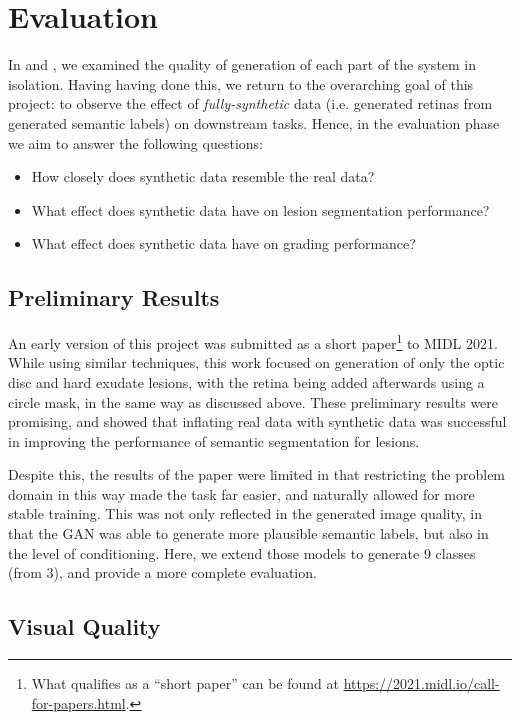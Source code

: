 \chapter{Evaluation} \label{cha:evaluation}

In  and , we examined the quality of generation of each part of the system in isolation.
Having having done this, we return to the overarching goal of this project: to observe the effect of \emph{fully-synthetic} data (i.e. generated retinas from generated semantic labels) on downstream tasks.
Hence, in the evaluation phase we aim to answer the following questions:
\begin{itemize}
    \item How closely does synthetic data resemble the real data?
    \item What effect does synthetic data have on lesion segmentation performance?
    \item What effect does synthetic data have on grading performance?
\end{itemize}

\section{Preliminary Results} \label{sec:prelim}

An early version of this project was submitted as a short paper\footnote{What qualifies as a ``short paper'' can be found at \url{https://2021.midl.io/call-for-papers.html}.} to MIDL 2021.
While using similar techniques, this work focused on generation of only the optic disc and hard exudate lesions, with the retina being added afterwards using a circle mask, in the same way as discussed above.
These preliminary results were promising, and showed that inflating real data with synthetic data was successful in improving the performance of semantic segmentation for lesions.

Despite this, the results of the paper were limited in that restricting the problem domain in this way made the task far easier, and naturally allowed for more stable training.
This was not only reflected in the generated image quality, in that the GAN was able to generate more plausible semantic labels, but also in the level of conditioning.
Here, we extend those models to generate 9 classes (from 3), and provide a more complete evaluation.

\section{Visual Quality}

